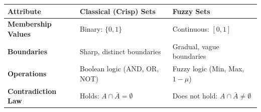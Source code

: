\documentclass[12pt,a4paper]{article}
\renewcommand{\arraystretch}{1.45}
\begin{document}
\begin{tcolorbox}[tikzbox, title={Crisp Sets vs. Fuzzy Sets}]
\centering
{\renewcommand{\arraystretch}{1.55}%
\begin{tabularx}{\linewidth}{|>{\bfseries}B{3.2cm}|Y|Y|}
\hline
Attribute & Classical (Crisp) Sets & Fuzzy Sets \\
\hline
Membership Values & Binary: $\{0, 1\}$ & Continuous: $[0, 1]$ \\
\hline
Boundaries & Sharp, distinct boundaries & Gradual, vague boundaries \\
\hline
Operations & Boolean logic (AND, OR, NOT) & Fuzzy logic (Min, Max, $1-\mu$) \\
\hline
Contradiction Law & Holds: $A \cap \bar{A} = \emptyset$ & Does not hold: $A \cap \bar{A} \neq \emptyset$ \\[4pt]
\hline
\end{tabularx}}
\end{tcolorbox}
\end{document}
